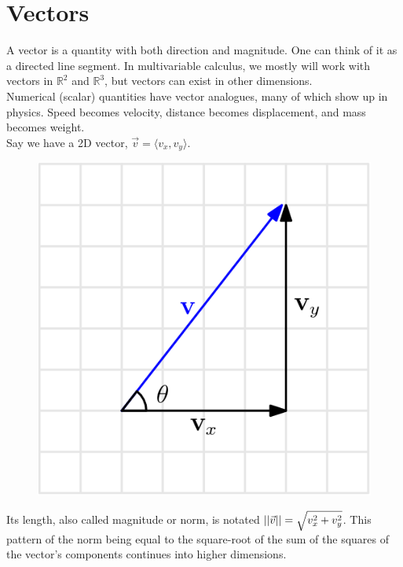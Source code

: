 \section{Vectors}
\noindent
A vector is a quantity with both direction and magnitude. One can think of it as a directed line segment. In multivariable calculus, we mostly will work with vectors in $\mathbb{R}^2$ and $\mathbb{R}^3$, but vectors can exist in other dimensions.\\

\noindent
Numerical (scalar) quantities have vector analogues, many of which show up in physics. Speed becomes velocity, distance becomes displacement, and mass becomes weight.\\

\noindent
Say we have a 2D vector, $\vec{v}=\langle v_x, v_y \rangle$.

\begin{figure}[h]
	\centering
	\includegraphics[scale=0.5]{Images/backgroundReview/VectorAddition}
\end{figure}

\noindent
Its length, also called magnitude or norm, is notated $\left|\left|\vec{v}\right|\right|=\sqrt{v_x^2+v_y^2}$. This pattern of the norm being equal to the square-root of the sum of the squares of the vector's components continues into higher dimensions.\\

